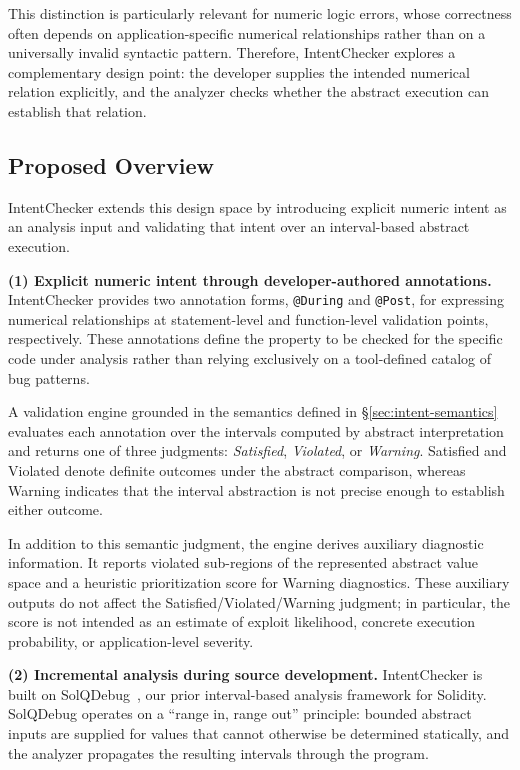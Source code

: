 \documentclass[pdflatex,sn-basic]{sn-jnl}%
\theoremstyle{thmstyleone}%
\theoremstyle{thmstyletwo}%
\theoremstyle{thmstylethree}%
\begin{document}
This distinction is particularly relevant for numeric logic errors, whose
correctness often depends on application-specific numerical relationships
rather than on a universally invalid syntactic pattern.
Therefore, IntentChecker explores a complementary design point:
the developer supplies the intended numerical relation explicitly, and the
analyzer checks whether the abstract execution can establish that relation.


\subsection{Proposed Overview}\label{sec:proposed-overview}

IntentChecker extends this design space by introducing explicit numeric intent
as an analysis input and validating that intent over an interval-based abstract
execution.

\smallskip
\noindent\textbf{(1) Explicit numeric intent through developer-authored
annotations.}
IntentChecker provides two annotation forms, \texttt{@During} and
\texttt{@Post}, for expressing numerical relationships at statement-level and
function-level validation points, respectively.
These annotations define the property to be checked for the specific code
under analysis rather than relying exclusively on a tool-defined catalog of
bug patterns.

A validation engine grounded in the semantics defined in
\S\ref{sec:intent-semantics} evaluates each annotation over the intervals
computed by abstract interpretation and returns one of three judgments:
\emph{Satisfied}, \emph{Violated}, or \emph{Warning}.
Satisfied and Violated denote definite outcomes under the abstract comparison,
whereas Warning indicates that the interval abstraction is not precise enough
to establish either outcome.

In addition to this semantic judgment, the engine derives auxiliary diagnostic
information.
It reports violated sub-regions of the represented abstract value space and a
heuristic prioritization score for Warning diagnostics.
These auxiliary outputs do not affect the
Satisfied/Violated/Warning judgment; in particular, the score is not intended
as an estimate of exploit likelihood, concrete execution probability, or
application-level severity.

\smallskip
\noindent\textbf{(2) Incremental analysis during source development.}
IntentChecker is built on SolQDebug~\citep{solqdebug}, our prior
interval-based analysis framework for Solidity.
SolQDebug operates on a ``range in, range out'' principle: bounded abstract
inputs are supplied for values that cannot otherwise be determined statically,
and the analyzer propagates the resulting intervals through the program.
\end{document}

